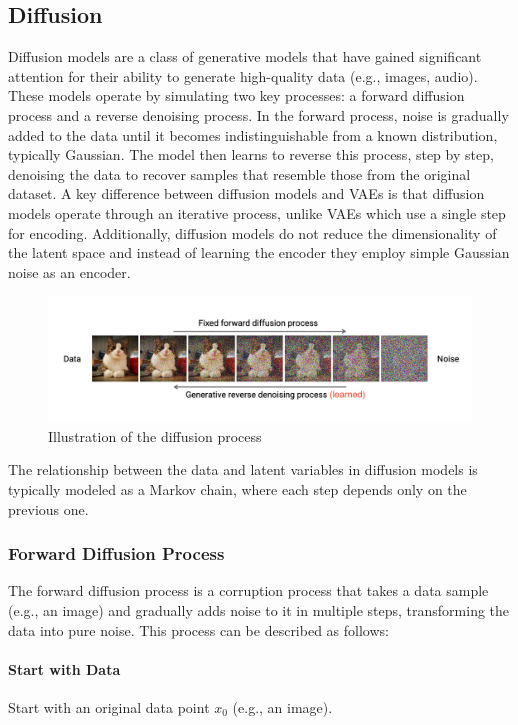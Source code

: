 \subsection{Diffusion}
Diffusion models are a class of generative models that have gained significant attention 
for their ability to generate high-quality data (e.g., images, audio). These models 
operate by simulating two key processes: a forward diffusion process and a reverse 
denoising process.\newline
In the forward process, noise is gradually added to the data until it becomes indistinguishable
from a known distribution, typically Gaussian. The model then learns to reverse this process, 
step by step, denoising the data to recover samples that resemble those from the original dataset.\newline
A key difference between diffusion models and VAEs is that diffusion models operate through an iterative 
process, unlike VAEs which use a single step for encoding. Additionally, diffusion models 
do not reduce the dimensionality of the latent space and instead of learning the encoder they employ 
simple Gaussian noise as an encoder.
\vspace{-1cm}
\begin{figure}[H]
    \centering
    \includegraphics[width=1\linewidth]{images/diffusion.png}
    \caption{Illustration of the diffusion process}
    \label{fig:diffusion}
\end{figure}
The relationship between the data and latent variables in diffusion models is typically modeled as a Markov chain,
where each step depends only on the previous one.

\subsubsection{Forward Diffusion Process}
The forward diffusion process is a corruption process that takes a data sample (e.g., an 
image) and gradually adds noise to it in multiple steps, transforming the data into pure 
noise. This process can be described as follows:

\paragraph{Start with Data}
Start with an original data point $x_0$ (e.g., an image).

